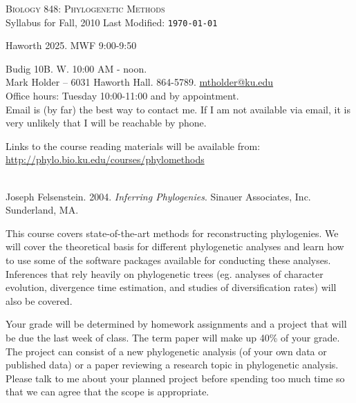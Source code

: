 \documentclass[11pt]{article}
\begin{document}
{\center
\Large
\textsc{Biology 848: Phylogenetic Methods}\\
\vskip 1cm
\large Syllabus for Fall, 2010 \hskip 6cm Last Modified: {\tt  \today}
}


\vskip 1cm
\par Haworth 2025. MWF 9:00-9:50\\
\par Budig 10B. W. 10:00 AM - noon.\\

\vskip 2mm
\noindent Mark Holder -- 6031 Haworth Hall. 864-5789. \href{mailto:mtholder@ku.edu}{mtholder@ku.edu}\\
Office hours: Tuesday 10:00-11:00 and by appointment.\\
Email is (by far) the best way to contact me.  If I am not available via email, it is very unlikely that I will be reachable by phone.

\vskip 2mm
\par
	Links to the course reading materials will be available from:\\ \url{http://phylo.bio.ku.edu/courses/phylomethods}

\vskip 2mm
\\
Joseph Felsenstein. 2004. {\it Inferring Phylogenies}. Sinauer Associates, Inc. Sunderland, MA.\par

\vskip 2mm
This course covers state-of-the-art methods for reconstructing phylogenies. We will cover the theoretical basis for different phylogenetic analyses and learn how to use some of the software packages available for conducting these analyses. Inferences that rely heavily on phylogenetic trees (eg. analyses of character evolution, divergence time estimation, and studies of diversification rates) will also be covered.

\vskip 2mm\par
Your grade will be determined by homework assignments and a project that will be due the last week of class.
The term paper will make up 40\% of your grade.
The project can consist of a new phylogenetic analysis (of your own data or published data) or a paper reviewing a research topic in phylogenetic analysis. 
Please talk to me about your planned project before spending too much time so that we can agree that the scope is appropriate.
\end{document}
